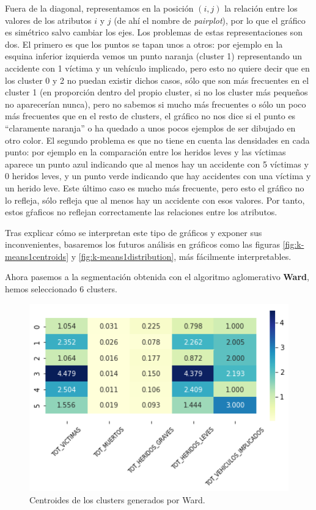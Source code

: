\documentclass[oneside]{book}
\begin{document}
Fuera de la diagonal, representamos en la posición $(i,j)$ la relación
entre los valores de los atributos $i$ y $j$ (de ahí el nombre de
\textit{pairplot}), por lo que el gráfico es simétrico salvo cambiar
los ejes. Los problemas de estas representaciones son dos. El primero
es que los puntos se tapan unos a otros: por ejemplo en la esquina
inferior izquierda vemos un punto naranja (cluster 1) representando un
accidente con 1 víctima y un vehículo implicado, pero esto no quiere
decir que en los cluster 0 y 2 no puedan existir dichos casos, sólo
que son más frecuentes en el cluster 1 (en proporción dentro del
propio cluster, si no los cluster más pequeños no aparecerían nunca),
pero no sabemos si mucho más frecuentes o sólo un poco más frecuentes
que en el resto de clusters, el gráfico no nos dice si el punto es
``claramente naranja'' o ha quedado a unos pocos ejemplos de ser
dibujado en otro color. El segundo problema es que no tiene en cuenta
las densidades en cada punto: por ejemplo en la comparación entre los
heridos leves y las víctimas aparece un punto azul indicando que al
menos hay un accidente con 5 víctimas y 0 heridos leves, y un punto
verde indicando que hay accidentes con una víctima y un herido
leve. Este último caso es mucho más frecuente, pero esto el gráfico no
lo refleja, sólo refleja que al menos hay un accidente con esos
valores. Por tanto, estos gŕaficos no reflejan correctamente las
relaciones entre los atributos.

Tras explicar cómo se interpretan este tipo de gráficos y exponer sus
inconvenientes, basaremos los futuros análisis en gráficos como las
figuras \ref{fig:k-means1centroids} y \ref{fig:k-means1distribution},
más fácilmente interpretables.

Ahora pasemos a la segmentación obtenida con el algoritmo aglomerativo
\textbf{Ward}, hemos seleccionado 6 clusters.

\begin{figure}[H]
  \centering
  \includegraphics[width=120mm]{figures/accidentes/ward1centroids}
  \caption{Centroides de los clusters generados por Ward.}
  \label{fig:ward1centroids}
\end{figure}
\end{document}
